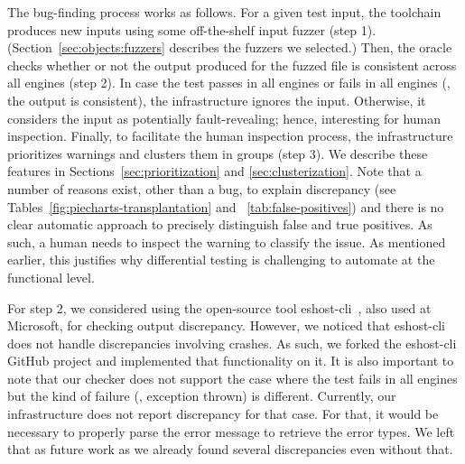 \documentclass[smallextended]{svjour3}
\begin{document}
The bug-finding process works as follows. For a given test input, the
toolchain produces new inputs using some off-the-shelf input fuzzer
(step 1).  (Section~\ref{sec:objects:fuzzers} describes the fuzzers we
selected.)  Then, the oracle checks whether or not the output produced
for the fuzzed file is consistent across all engines (step 2). In case
the test passes in all engines or fails in all engines (\ie{}, the
output is consistent), the infrastructure ignores the
input. Otherwise, it considers the input as potentially
fault-revealing; hence, interesting for human inspection. Finally, to
facilitate the human inspection process, the infrastructure
prioritizes warnings and clusters them in groups (step 3). We describe
these features in Sections~\ref{sec:prioritization} and
\ref{sec:clusterization}. Note that a number of reasons exist, other
than a bug, to explain discrepancy (see
Tables~\ref{fig:piecharts-transplantation} and
~\ref{tab:false-positives}) and there is no clear automatic approach
to precisely distinguish false and true positives. As such, a human
needs to inspect the warning to classify the issue. As mentioned
earlier, this justifies why differential testing is challenging to
automate at the functional level.

For step 2, we considered using the open-source tool
eshost-cli~\cite{eshost-cli}, also used at Microsoft, for checking
output discrepancy. However, we noticed that eshost-cli does not
handle discrepancies involving crashes. As such, we forked the
eshost-cli GitHub project and implemented that functionality on it. It
is also important to note that our checker does not support the case
where the test fails in all engines but the kind of failure (\eg{},
exception thrown) is different. Currently, our infrastructure does not
report discrepancy for that case. For that, it would be necessary to
properly parse the error message to retrieve the error types. We left
that as future work as we already found several discrepancies even
without that.

\end{document}
